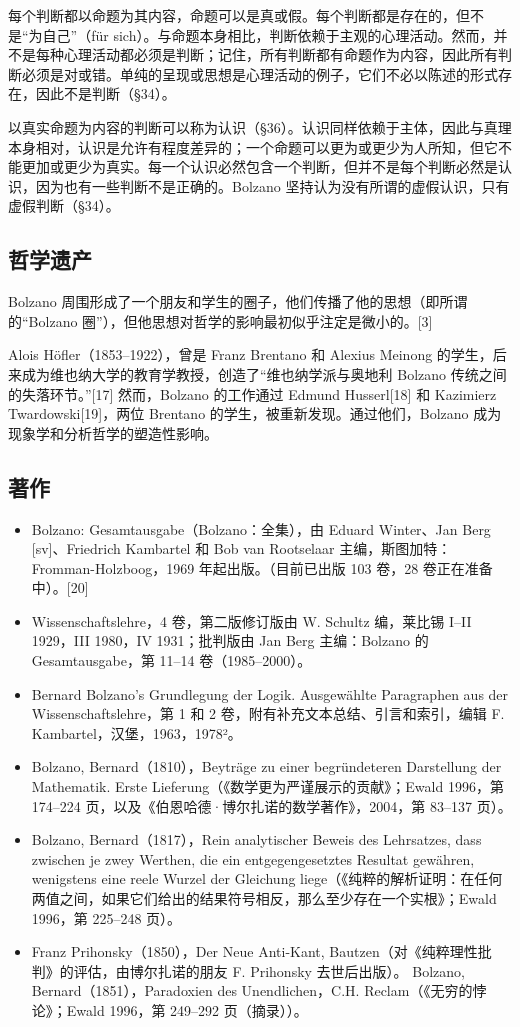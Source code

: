 每个判断都以命题为其内容，命题可以是真或假。每个判断都是存在的，但不是“为自己”（für sich）。与命题本身相比，判断依赖于主观的心理活动。然而，并不是每种心理活动都必须是判断；记住，所有判断都有命题作为内容，因此所有判断必须是对或错。单纯的呈现或思想是心理活动的例子，它们不必以陈述的形式存在，因此不是判断（§34）。

以真实命题为内容的判断可以称为认识（§36）。认识同样依赖于主体，因此与真理本身相对，认识是允许有程度差异的；一个命题可以更为或更少为人所知，但它不能更加或更少为真实。每一个认识必然包含一个判断，但并不是每个判断必然是认识，因为也有一些判断不是正确的。Bolzano 坚持认为没有所谓的虚假认识，只有虚假判断（§34）。
\subsection{哲学遗产}
Bolzano 周围形成了一个朋友和学生的圈子，他们传播了他的思想（即所谓的“Bolzano 圈”），但他思想对哲学的影响最初似乎注定是微小的。[3]

Alois Höfler（1853–1922），曾是 Franz Brentano 和 Alexius Meinong 的学生，后来成为维也纳大学的教育学教授，创造了“维也纳学派与奥地利 Bolzano 传统之间的失落环节。”[17] 然而，Bolzano 的工作通过 Edmund Husserl[18] 和 Kazimierz Twardowski[19]，两位 Brentano 的学生，被重新发现。通过他们，Bolzano 成为现象学和分析哲学的塑造性影响。
\subsection{著作}
\begin{itemize}
\item Bolzano: Gesamtausgabe（Bolzano：全集），由 Eduard Winter、Jan Berg [sv]、Friedrich Kambartel 和 Bob van Rootselaar 主编，斯图加特：Fromman-Holzboog，1969 年起出版。（目前已出版 103 卷，28 卷正在准备中）。[20]  
\item Wissenschaftslehre，4 卷，第二版修订版由 W. Schultz 编，莱比锡 I–II 1929，III 1980，IV 1931；批判版由 Jan Berg 主编：Bolzano 的 Gesamtausgabe，第 11–14 卷（1985–2000）。  
\item Bernard Bolzano's Grundlegung der Logik. Ausgewählte Paragraphen aus der Wissenschaftslehre，第 1 和 2 卷，附有补充文本总结、引言和索引，编辑 F. Kambartel，汉堡，1963，1978²。  
\item Bolzano, Bernard（1810），Beyträge zu einer begründeteren Darstellung der Mathematik. Erste Lieferung（《数学更为严谨展示的贡献》；Ewald 1996，第 174–224 页，以及《伯恩哈德·博尔扎诺的数学著作》，2004，第 83–137 页）。  
\item Bolzano, Bernard（1817），Rein analytischer Beweis des Lehrsatzes, dass zwischen je zwey Werthen, die ein entgegengesetztes Resultat gewähren, wenigstens eine reele Wurzel der Gleichung liege（《纯粹的解析证明：在任何两值之间，如果它们给出的结果符号相反，那么至少存在一个实根》；Ewald 1996，第 225–248 页）。  
\item Franz Prihonsky（1850），Der Neue Anti-Kant, Bautzen（对《纯粹理性批判》的评估，由博尔扎诺的朋友 F. Prihonsky 去世后出版）。  
Bolzano, Bernard（1851），Paradoxien des Unendlichen，C.H. Reclam（《无穷的悖论》；Ewald 1996，第 249–292 页（摘录））。  
\end{itemize}


